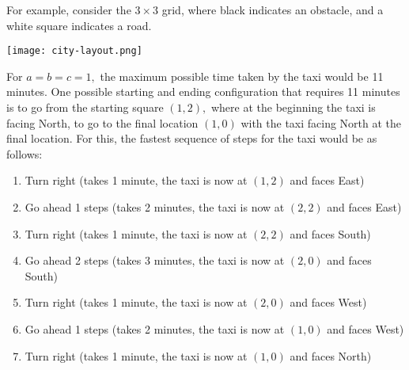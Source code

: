 \documentclass{assignment-373}
\begin{document}
\begin{enumerate}
For example, consider the $3 \times 3$ grid, where black indicates an
obstacle, and a white square indicates a road. 
\begin{center}
\texttt{[image: city-layout.png]}
\end{center}
For $a=b=c=1,$ the maximum possible time taken by the taxi would be 11
minutes. One possible starting and ending configuration that requires
11 minutes is to go from the starting square $(1,2),$ where at the
beginning the taxi is facing North, to go to the final location $(1,0)$
with the taxi facing North at the final location. For this, the
fastest sequence of steps for the taxi would be as follows:
\begin{enumerate}
\item Turn right (takes 1 minute, the taxi is now at $(1,2)$ and faces
  East)
\item Go ahead 1 steps (takes 2 minutes, the taxi is now at $(2,2)$
  and faces East)
\item Turn right (takes 1 minute, the taxi is now at $(2,2)$ and faces
  South)
\item Go ahead 2 steps (takes 3 minutes, the taxi is now at $(2,0)$
  and faces South)
\item Turn right (takes 1 minute, the taxi is now at $(2,0)$ and faces
  West)
\item Go ahead 1 steps (takes 2 minutes, the taxi is now at $(1,0)$
  and faces West)
\item Turn right (takes 1 minute, the taxi is now at $(1,0)$ and faces
  North)
\end{enumerate}






\end{enumerate}
\end{document}
